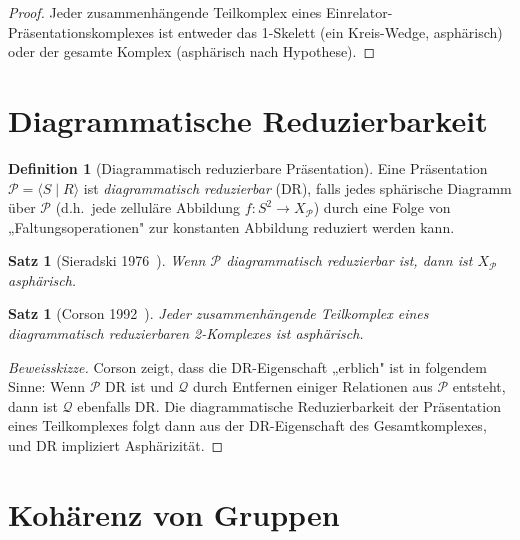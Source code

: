 \documentclass[12pt,a4paper]{amsart}
\newtheorem{satz}[theorem]{Satz}
\theoremstyle{definition}
\newtheorem{definition_de}[theorem]{Definition}
\theoremstyle{remark}
\begin{document}
\begin{proof}
Jeder zusammenhängende Teilkomplex eines Einrelator-Präsentationskomplexes
ist entweder das 1-Skelett (ein Kreis-Wedge, asphärisch) oder der gesamte
Komplex (asphärisch nach Hypothese).
\end{proof}

\section{Diagrammatische Reduzierbarkeit}

\begin{definition_de}[Diagrammatisch reduzierbare Präsentation]
Eine Präsentation $\mathcal{P} = \langle S \mid R \rangle$ ist
\emph{diagrammatisch reduzierbar} (DR), falls jedes sphärische Diagramm
über $\mathcal{P}$ (d.h.\ jede zelluläre Abbildung $f \colon S^2 \to X_{\mathcal{P}}$)
durch eine Folge von „Faltungsoperationen" zur konstanten Abbildung
reduziert werden kann.
\end{definition_de}

\begin{satz}[Sieradski 1976~\cite{Sieradski1976}]
Wenn $\mathcal{P}$ diagrammatisch reduzierbar ist, dann ist
$X_{\mathcal{P}}$ asphärisch.
\end{satz}

\begin{satz}[Corson 1992~\cite{Corson1992}]
\label{satz:Corson}
Jeder zusammenhängende Teilkomplex eines diagrammatisch reduzierbaren
2-Komplexes ist asphärisch.
\end{satz}

\begin{proof}[Beweisskizze]
Corson zeigt, dass die DR-Eigenschaft „erblich" ist in folgendem Sinne:
Wenn $\mathcal{P}$ DR ist und $\mathcal{Q}$ durch Entfernen einiger
Relationen aus $\mathcal{P}$ entsteht, dann ist $\mathcal{Q}$ ebenfalls DR.
Die diagrammatische Reduzierbarkeit der Präsentation eines Teilkomplexes
folgt dann aus der DR-Eigenschaft des Gesamtkomplexes, und DR impliziert
Asphärizität.
\end{proof}

\section{Kohärenz von Gruppen}
\end{document}
